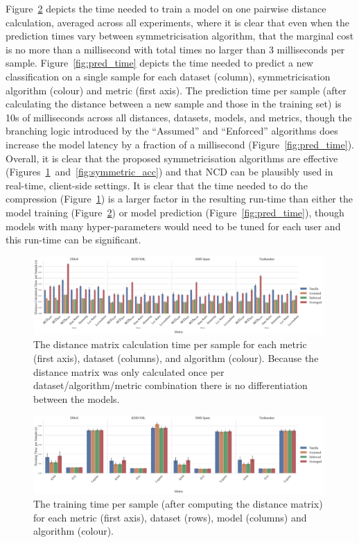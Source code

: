 \documentclass[preprint,12pt]{article}
\begin{document}
Figure~\ref{fig:train_time} depicts the time needed to train a model on one pairwise distance calculation, averaged across all experiments, where it is clear that even when the prediction times vary between symmetricisation algorithm, that the marginal cost is no more than a millisecond with total times no larger than 3 milliseconds per sample.
Figure~\ref{fig:pred_time} depicts the time needed to predict a new classification on a single sample for each dataset (column), symmetricisation algorithm (colour) and metric (first axis).
The prediction time per sample (after calculating the distance between a new sample and those in the training set) is 10s of milliseconds across all distances, datasets, models, and metrics, though the branching logic introduced by the ``Assumed'' and ``Enforced'' algorithms does increase the model latency by a fraction of a millisecond (Figure~\ref{fig:pred_time}).
Overall, it is clear that the proposed symmetricisation algorithms are effective (Figures~\ref{fig:distance_time}~and~\ref{fig:symmetric_acc}) and that NCD can be plausibly used in real-time, client-side settings.
It is clear that the time needed to do the compression (Figure~\ref{fig:distance_time}) is a larger factor in the resulting run-time than either the model training (Figure~\ref{fig:train_time}) or model prediction (Figure~\ref{fig:pred_time}), though models with many hyper-parameters would need to be tuned for each user and this run-time can be significant.


\begin{figure}[H]
    \centering
    \includegraphics[width=0.99\textwidth]{images/distance_time_vs_symmetry.pdf}
    \caption{The distance matrix calculation time per sample for each metric (first axis), dataset (columns), and algorithm (colour). Because the distance matrix was only calculated once per dataset/algorithm/metric combination there is no differentiation between the models.}
    \label{fig:distance_time}
\end{figure}

\begin{figure}[H]
    \centering
    \includegraphics[width=0.99\textwidth]{images/train_time_vs_symmetry.pdf}
    \caption{The training time  per sample (after computing the distance matrix) for each metric (first axis), dataset (rows), model (columns) and algorithm (colour).}
    \label{fig:train_time}
\end{figure}
\end{document}
